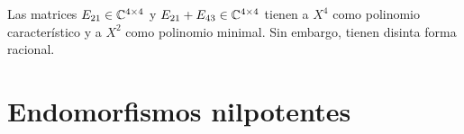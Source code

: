 %

\begin{example}
    Las matrices $E_{21}\in\mathbb{C}^{4\times4}$ y $E_{21}+E_{43}\in\mathbb{C}^{4\times4}$
    tienen a $X^4$ como polinomio característico y a $X^2$ como polinomio
    minimal. Sin embargo, tienen disinta forma racional.
\end{example}



\section{Endomorfismos nilpotentes}

